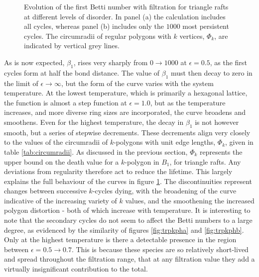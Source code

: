 \begin{figure}[tb]
	\caption{Evolution of the first Betti number with filtration for triangle rafts at different levels of disorder. In panel (a) the calculation includes all cycles, whereas panel (b) includes only the $1000$ most persistent cycles. The circumradii of regular polygons with $k$ vertices, $\Phi_k$, are indicated by vertical grey lines.}
	\label{fig:trbetti}
\end{figure}

As is now expected, $\beta_1$, rises very sharply from $0\rightarrow 1000$ at $\epsilon=0.5$, as the first cycles form at half the bond distance.
The value of $\beta_1$ must then decay to zero in the limit of $\epsilon\rightarrow \infty$, but the form of the curve varies with the system temperature.
At the lowest temperature, which is primarily a hexagonal lattice, the function is almost a step function at $\epsilon=1.0$, but as the temperature increases, and more diverse ring sizes are incorporated, the curve broadens and smoothens.
Even for the highest temperature, the decay in $\beta_1$ is not however smooth, but a series of stepwise decrements.
These decrements align very closely to the values of the circumradii of $k$\--polygons with unit edge lengths, $\Phi_k$, given in table \ref{tab:circumradii}.
As discussed in the previous section, $\Phi_k$ represents the upper bound on the death value for a $k$\--polygon in $B_1$, for triangle rafts. 
Any deviations from regularity therefore act to reduce the lifetime.
This largely explains the full behaviour of the curves in figure \ref{fig:trbetti}.
The discontinuities represent changes between successive $k$\--cycles dying, with the broadening of the curve indicative of the increasing variety of $k$ values, and the smoothening the increased polygon distortion - both of which increase with temperature.
It is interesting to note that the secondary cycles do not seem to affect the Betti numbers to a large degree, as evidenced by the similarity of figures \ref{fig:trpkpha} and \ref{fig:trpkphb}.
Only at the highest temperature is there a detectable presence in the region between $\epsilon=0.5\rightarrow0.7$.
This is because these species are so relatively short\--lived and spread throughout the filtration range, that at any filtration value they add a virtually insignificant contribution to the total. 


